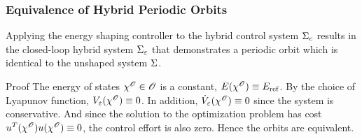 \begin{frame}[t]
  \frametitle{Equivalence of Hybrid Periodic Orbits}
  \begin{lemma}
    Applying the energy shaping controller to the hybrid control system $\Sigma_{c}$
    results in the closed-loop hybrid system $\Sigma_{\varepsilon}$ that demonstrates a
    periodic orbit which is identical to the unshaped system $\Sigma$.
  \end{lemma}
  \begin{block}{Proof}
    The energy of states $\chi^{\mathscr O} \in \mathscr O$ is a constant,
    $E(\chi^{\mathscr O}) \equiv E_{\mathrm{ref}}$. By the choice of Lyapunov function,
    $V_{\varepsilon}(\chi^{\mathscr O}) \equiv 0$. In addition, ${\dot V}_{\varepsilon}(\chi^{\mathscr O}) \equiv 0$ since
    the system is conservative. And since the solution to the optimization
    problem has cost $u^{T}(\chi^{\mathscr O}) u(\chi^{\mathscr O}) \equiv 0$, the
    control effort is also zero. Hence the orbits are equivalent.
  \end{block}
\end{frame}

